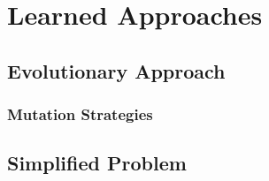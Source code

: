 \section{Learned Approaches}

\subsection{Evolutionary Approach}
\todo{}
\subsubsection{Mutation Strategies}

\subsection{Simplified Problem}
\todo{}